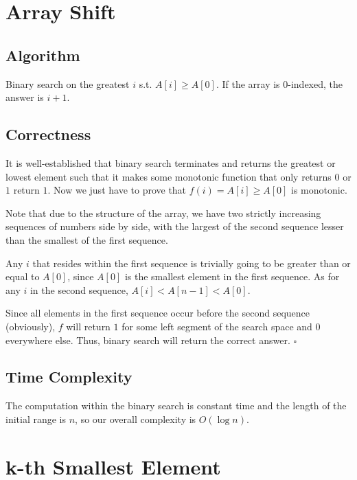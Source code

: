 \documentclass[12pt]{article}
\begin{document}
\section{Array Shift}\label{arrshift}

\subsection{Algorithm}

Binary search on the greatest $i$ s.t. $A[i] \ge A[0]$.
If the array is 0-indexed, the answer is $i+1$.

\subsection{Correctness}

It is well-established that binary search terminates
and returns the greatest or lowest element such that it makes some
monotonic function that only returns $0$ or $1$ return $1$.
Now we just have to prove that $f(i)=A[i] \ge A[0]$ is monotonic.

Note that due to the structure of the array,
we have two strictly increasing sequences of numbers side by side,
with the largest of the second sequence lesser than the smallest of the first sequence.

Any $i$ that resides within the first sequence is trivially
going to be greater than or equal to $A[0]$, since $A[0]$ is the smallest element
in the first sequence.
As for any $i$ in the second sequence, $A[i]<A[n-1]<A[0]$.

Since all elements in the first sequence occur before the second sequence (obviously),
$f$ will return $1$ for some left segment of the search space and $0$ everywhere else.
Thus, binary search will return the correct answer. $\square$

\subsection{Time Complexity}

The computation within the binary search is constant time and the length of the
initial range is $n$, so our overall complexity is $\boxed{O(\log n)}$.

\pagebreak

\section{k-th Smallest Element}
\end{document}
